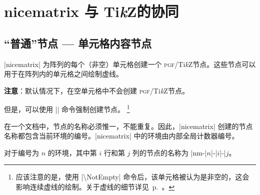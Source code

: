 \documentclass[dvipsnames]{article}%
\def\tikzname{Ti\emph{k}Z}
\begin{document}
\section{nicematrix 与 \tikzname 的协同}

\label{name}\label{PGF-nodes}

\subsection{“普通”节点 --- 单元格内容节点}
\label{zm:NormalNodes}


|nicematrix| 为阵列的每个（非空）单元格创建一个 \textsc{pgf}/\tikzname 节点。这些节点可以用于在阵列内的单元格之间绘制虚线。


\smallskip
\textbf{注意}：默认情况下，在空单元格中不会创建 \textsc{pgf}/\tikzname 节点。

\smallskip
但是，可以使用 |\NotEmpty| 命令强制创建节点。
\footnote{应该注意的是，使用 |\textbackslash NotEmpty| 命令后，该单元格被认为是非空的，这会影响连续虚线的绘制。关于虚线的细节详见~p.~\pageref{Cdots}。}

\medskip
在一个文档中，节点的名称必须惟一，不能重复。因此，|nicematrix| 创建的节点名称都包含当前环境的编号。|nicematrix| 中的环境由内部全局计数器编号。 

\smallskip
对于编号为 $n$ 的环境，其中第 $i$ 行和第 $j$ 列的节点的名称为 |nm-|$n$|-|$i$|-|$j$。
\end{document}
